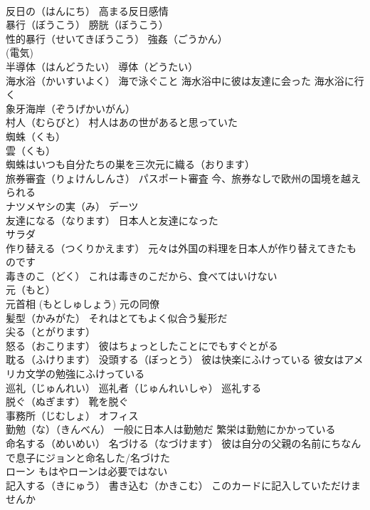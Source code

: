 \documentclass[8pt]{extreport}
\begin{document}
\begin{CJK}{UTF8}{min}
\\	反日の（はんにち） 高まる反日感情
\\	暴行（ぼうこう） 膀胱（ぼうこう）
\\	性的暴行（せいてきぼうこう） 強姦（ごうかん）
\\	(電気) 
\\	半導体（はんどうたい） 導体（どうたい）
\\	海水浴（かいすいよく） 海で泳ぐこと 海水浴中に彼は友達に会った 海水浴に行く
\\	象牙海岸（ぞうげかいがん）
\\	村人（むらびと） 村人はあの世があると思っていた
\\	蜘蛛（くも）
\\	雲（くも） 
\\	蜘蛛はいつも自分たちの巣を三次元に織る（おります）
\\	旅券審査（りょけんしんさ） パスポート審査 今、旅券なしで欧州の国境を越えられる
\\	ナツメヤシの実（み） デーツ
\\	友達になる（なります） 日本人と友達になった
\\	サラダ
\\	作り替える（つくりかえます） 元々は外国の料理を日本人が作り替えてきたものです
\\	毒きのこ（どく） これは毒きのこだから、食べてはいけない
\\	元（もと） 
\\	元首相 (もとしゅしょう) 元の同僚
\\	髪型（かみがた） それはとてもよく似合う髪形だ
\\	尖る（とがります）
\\	怒る（おこります） 彼はちょっとしたことにでもすぐとがる
\\	耽る（ふけります） 没頭する（ぼっとう） 彼は快楽にふけっている 彼女はアメリカ文学の勉強にふけっている
\\	巡礼（じゅんれい） 巡礼者（じゅんれいしゃ） 巡礼する
\\	脱ぐ（ぬぎます） 靴を脱ぐ
\\	事務所（じむしょ） オフィス
\\	勤勉（な）（きんべん） 一般に日本人は勤勉だ 繁栄は勤勉にかかっている
\\	命名する（めいめい） 名づける（なづけます） 彼は自分の父親の名前にちなんで息子にジョンと命名した/名づけた
\\	ローン もはやローンは必要ではない
\\	記入する（きにゅう） 書き込む（かきこむ） このカードに記入していただけませんか

\end{CJK}
\end{document}
